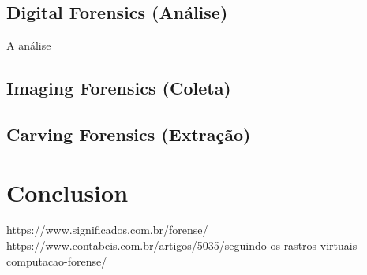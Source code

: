 \documentclass[journal]{IEEEtran}
\begin{document}
\subsection{Digital Forensics (Análise)}
A análise 

\subsection{Imaging Forensics (Coleta)}


\subsection{Carving Forensics (Extração)}



\section{Conclusion}




\begin{thebibliography}{1}

https://www.significados.com.br/forense/
https://www.contabeis.com.br/artigos/5035/seguindo-os-rastros-virtuais-computacao-forense/


\end{thebibliography}
\end{document}
